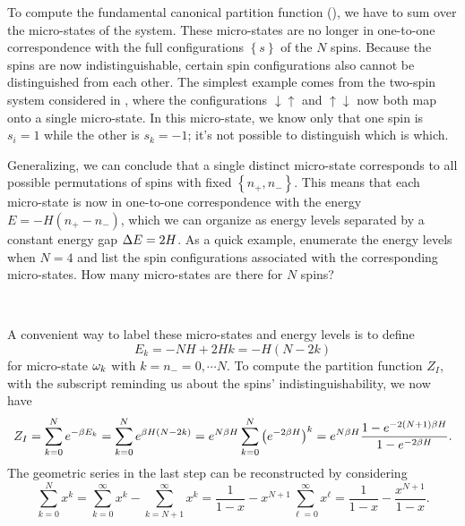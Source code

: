 To compute the fundamental canonical partition function (), we have to sum over the micro-states of the system.
These micro-states are no longer in one-to-one correspondence with the full configurations $\left\{s\right\}$ of the $N$ spins.
Because the spins are now indistinguishable, certain spin configurations also cannot be distinguished from each other.
The simplest example comes from the two-spin system considered in , where the configurations $\downarrow\uparrow$ and $\uparrow\downarrow$ now both map onto a single micro-state.
In this micro-state, we know only that one spin is $s_i = 1$ while the other is $s_k = -1$; it's not possible to distinguish which is which.

Generalizing, we can conclude that a single distinct micro-state corresponds to all possible permutations of spins with fixed $\left\{n_+, n_-\right\}$.
This means that each micro-state is now in one-to-one correspondence with the energy $E = -H(n_+ - n_-)$, which we can organize as energy levels separated by a constant energy gap $\Delta E = 2H$.
As a quick example, enumerate the energy levels when $N = 4$ and list the spin configurations associated with the corresponding micro-states.
How many micro-states are there for $N$ spins?
\begin{mdframed}
  \ \\[120 pt]
\end{mdframed}

A convenient way to label these micro-states and energy levels is to define
\begin{equation*}
  E_k = -NH + 2Hk = -H(N - 2k)
\end{equation*}
for micro-state $\omega_k$ with $k = n_- = 0, \cdots N$.
To compute the partition function $Z_I$, with the subscript reminding us about the spins' indistinguishability, we now have
\begin{equation}
  Z_I = \sum_{k = 0}^N e^{-\beta E_k} = \sum_{k = 0}^N e^{\beta H (N - 2k)} = e^{N\beta H} \sum_{k = 0}^N \left(e^{-2\beta H}\right)^k = e^{N\beta H} \frac{1 - e^{-2(N + 1) \beta H}}{1 - e^{-2\beta H}}.
\end{equation}
The geometric series in the last step can be reconstructed by considering
\begin{equation*}
  \sum_{k = 0}^N x^k = \sum_{k = 0}^{\infty} x^k - \sum_{k = N + 1}^{\infty} x^k = \frac{1}{1 - x} - x^{N + 1} \sum_{\ell = 0}^{\infty} x^{\ell} = \frac{1}{1 - x} - \frac{x^{N + 1}}{1 - x}.
\end{equation*}

